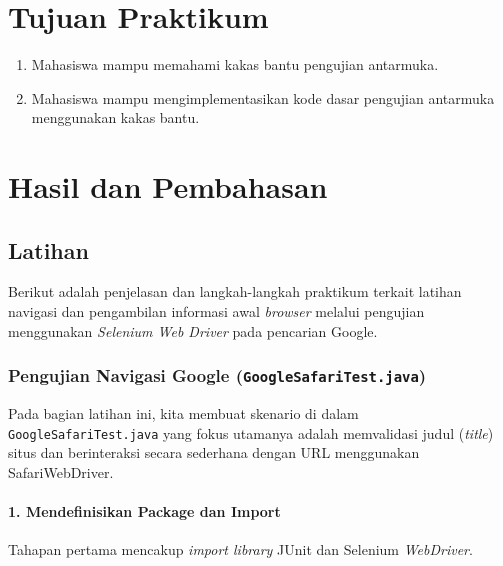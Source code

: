 \documentclass[a4paper,oneside,12pt]{report}
\newcommand{\tocboldsection}[1]{%
  \protect\renewcommand{\protect\cftchapfont}{\protect\bfseries}%
  #1%
  \protect\renewcommand{\protect\cftchapfont}{}%
}
\begin{document}
\chapter[Tujuan Praktikum]{Tujuan Praktikum}
\begin{enumerate}
    \item Mahasiswa mampu memahami kakas bantu pengujian antarmuka.
    \item Mahasiswa mampu mengimplementasikan kode dasar pengujian antarmuka menggunakan kakas bantu.
\end{enumerate}
\clearpage

\chapter[\texorpdfstring{\tocboldsection{Hasil dan Pembahasan}}{Hasil dan Pembahasan}]{Hasil dan Pembahasan}

\section{Latihan}

Berikut adalah penjelasan dan langkah-langkah praktikum terkait latihan navigasi dan pengambilan informasi awal \textit{browser} melalui pengujian menggunakan \textit{Selenium Web Driver} pada pencarian Google.

\subsection{Pengujian Navigasi Google (\texttt{GoogleSafariTest.java})}
Pada bagian latihan ini, kita membuat skenario di dalam \texttt{GoogleSafariTest.java} yang fokus utamanya adalah memvalidasi judul (\textit{title}) situs dan berinteraksi secara sederhana dengan URL menggunakan SafariWebDriver.

\subsubsection*{1. Mendefinisikan Package dan Import}
Tahapan pertama mencakup \textit{import library} JUnit dan Selenium \textit{WebDriver}.
\end{document}
